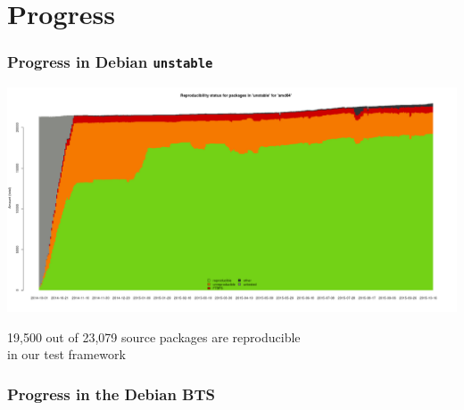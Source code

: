 \documentclass[14pt,aspectratio=169]{beamer}
\begin{document}
\section{Progress}

\begin{frame}[plain]
 \frametitle{Progress in Debian \texttt{unstable}}
 \begin{center}
  \includegraphics[height=0.73\paperheight]{images/stats_pkg_state.png}

  \small{19,500 out of 23,079 source packages are reproducible \\
    in our test framework}
  \vfill
 \end{center}
\end{frame}


\begin{frame}[plain]
 \frametitle{Progress in the Debian BTS}
\end{frame}
\end{document}
